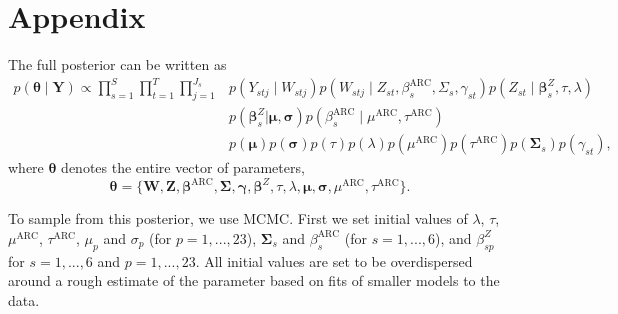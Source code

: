 \documentclass[12pt]{article}
\def\bbeta{\pmb{\beta}}
\def\bgamma{\pmb{\gamma}}
\def\bmu{\pmb{\mu}}
\def\bsigma{\pmb{\sigma}}
\def\bSigma{\pmb{\Sigma}}
\def\btheta{\pmb{\theta}}
\def\bY{\pmb{Y}}
\def\bZ{\pmb{Z}}
\def\bW{\pmb{W}}
\begin{document}
\newpage
\small\normalsize
%




\newpage
\section{Appendix}

The full posterior can be written as
\begin{align*}
p(\btheta \mid \bY) \propto \prod_{s = 1}^S \prod_{t = 1}^T \prod_{j = 1}^{J_s} & p(Y_{stj} \mid W_{stj}) p(W_{stj} \mid Z_{st}, \beta_s^\text{ARC}, \Sigma_s, \gamma_{st}) p(Z_{st} \mid \bbeta_s^Z, \tau, \lambda) \\
& p(\bbeta_s^Z | \bmu, \bsigma) p(\beta_s^\text{ARC} \mid \mu^\text{ARC}, \tau^\text{ARC}) \\
& p(\bmu) p(\bsigma) p(\tau) p(\lambda) p(\mu^\text{ARC}) p(\tau^\text{ARC}) p(\bSigma_s) p(\gamma_{st}),
\end{align*}
where $\btheta$ denotes the entire vector of parameters, 
$$
\btheta = \{\bW, \bZ, \bbeta^\text{ARC}, \bSigma, \bgamma, \bbeta^Z, \tau, \lambda, \bmu, \bsigma, \mu^\text{ARC}, \tau^\text{ARC}\}.
$$

To sample from this posterior, we use MCMC. First we set initial values of $\lambda$, $\tau$, $\mu^\text{ARC}$, $\tau^\text{ARC}$, $\mu_p$ and $\sigma_p$ (for $p = 1, ..., 23$), $\bSigma_s$ and $\beta_s^\text{ARC}$ (for $s = 1, ..., 6$), and $\beta^Z_{sp}$ for $s = 1, ..., 6$ and $p = 1, ..., 23$. All initial values are set to be overdispersed around a rough estimate of the parameter based on fits of smaller models to the data.
\end{document}
